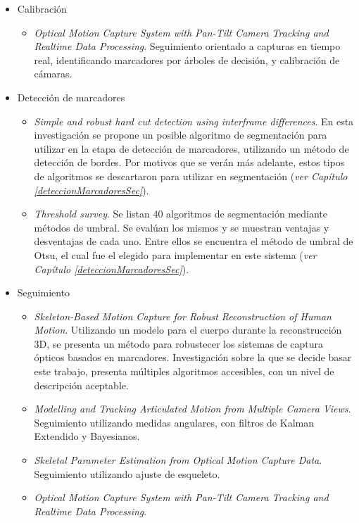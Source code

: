 \begin{itemize}
	\item Calibración
	\begin{itemize}
		\item \emph{Optical Motion Capture System with Pan-Tilt Camera Tracking and Realtime Data Processing}\cite{kurihara2002optical}. Seguimiento orientado a capturas en tiempo real, identificando marcadores por árboles de decisión, y calibración de cámaras.
	\end{itemize}
	\item Detección de marcadores
	\begin{itemize}
		\item \emph{Simple and robust hard cut detection using interframe differences}\cite{pardo2005simple}. En esta investigación se propone un posible algoritmo de segmentación para utilizar en la etapa de detección de marcadores, utilizando un método de detección de bordes. Por motivos que se verán más adelante, estos tipos de algoritmos se descartaron para utilizar en segmentación (\textit{ver Capítulo \ref{deteccionMarcadoresSec}}).
		\item \emph{Threshold survey}\cite{surveyThreshold}. Se listan 40 algoritmos de segmentación mediante métodos de umbral. Se evalúan los mismos y se muestran ventajas y desventajas de cada uno. Entre ellos se encuentra el método de umbral de Otsu\cite{otsu}, el cual fue el elegido para implementar en este sistema (\textit{ver Capítulo \ref{deteccionMarcadoresSec}}).
	\end{itemize}
	\item Seguimiento
	\begin{itemize}
		\item \emph{Skeleton-Based Motion Capture for Robust Reconstruction of Human Motion}\cite{herda}. Utilizando un modelo para el cuerpo durante la reconstrucción 3D, se presenta un método para robustecer los sistemas de captura ópticos basados en marcadores. Investigación sobre la que se decide basar este trabajo, presenta múltiples algoritmos accesibles, con un nivel de descripción aceptable.
		\item \emph{Modelling and Tracking Articulated Motion from Multiple Camera Views}\cite{ringer2000modelling}. Seguimiento utilizando medidas angulares, con filtros de Kalman Extendido y Bayesianos.
		\item \emph{Skeletal Parameter Estimation from Optical Motion Capture Data}\cite{kirk2005skeletal}. Seguimiento utilizando ajuste de esqueleto.
		\item \emph{Optical Motion Capture System with Pan-Tilt Camera Tracking and  Realtime Data Processing}\cite{kurihara2002optical}.

\end{itemize}
\end{itemize}
